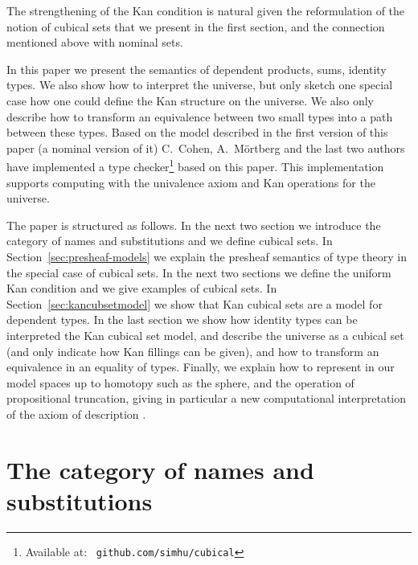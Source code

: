 \documentclass[a4paper,USenglish,draft]{lipics}
\begin{document}
The strengthening of the Kan condition is natural given the
reformulation of the notion of cubical sets that we present in the
first section, and the connection mentioned above with nominal sets.


In this paper we present the semantics of dependent products, sums,
identity types. We also show how to interpret the universe, but only
sketch one special case how one could define the Kan structure on the
universe. We also only describe how to transform an equivalence
between two small types into a path between these types.  Based on the
model described in the first version of this paper (a nominal version
of it) C.~Cohen, A.~M\"ortberg and the last two authors have
implemented a type checker\footnote{Available at: {\tt
    github.com/simhu/cubical}} based on this paper.  This
implementation supports computing with the univalence axiom and Kan
operations for the universe.

The paper is structured as follows. In the next two section we
introduce the category of names and substitutions and we define
cubical sets.  In Section~\ref{sec:presheaf-models} we explain the
presheaf semantics of type theory in the special case of cubical
sets. In the next two sections we define the uniform Kan condition and
we give examples of cubical sets.  In Section~\ref{sec:kancubsetmodel}
we show that Kan cubical sets are a model for dependent types.  In the
last section we show how identity types can be interpreted the Kan
cubical set model, and describe the universe as a cubical set (and
only indicate how Kan fillings can be given), and how to transform an
equivalence in an equality of types.  Finally, we explain how to
represent in our model spaces up to homotopy such as the sphere, and
the operation of propositional truncation, giving in particular a new
computational interpretation of the axiom of description
\cite{Russell}.

\section{The category of names and substitutions}
\end{document}
